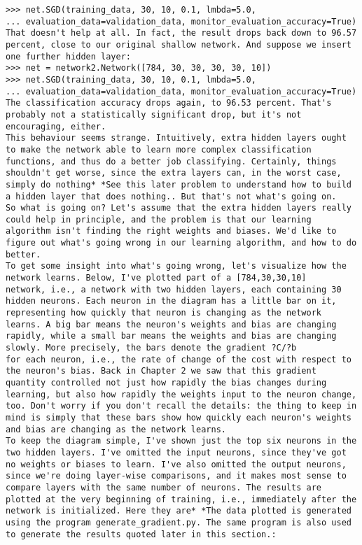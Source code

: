\begin{lstlisting}
>>> net.SGD(training_data, 30, 10, 0.1, lmbda=5.0, 
... evaluation_data=validation_data, monitor_evaluation_accuracy=True)
That doesn't help at all. In fact, the result drops back down to 96.57 percent, close to our original shallow network. And suppose we insert one further hidden layer:
>>> net = network2.Network([784, 30, 30, 30, 30, 10])
>>> net.SGD(training_data, 30, 10, 0.1, lmbda=5.0, 
... evaluation_data=validation_data, monitor_evaluation_accuracy=True)
The classification accuracy drops again, to 96.53 percent. That's probably not a statistically significant drop, but it's not encouraging, either.
This behaviour seems strange. Intuitively, extra hidden layers ought to make the network able to learn more complex classification functions, and thus do a better job classifying. Certainly, things shouldn't get worse, since the extra layers can, in the worst case, simply do nothing* *See this later problem to understand how to build a hidden layer that does nothing.. But that's not what's going on.
So what is going on? Let's assume that the extra hidden layers really could help in principle, and the problem is that our learning algorithm isn't finding the right weights and biases. We'd like to figure out what's going wrong in our learning algorithm, and how to do better.
To get some insight into what's going wrong, let's visualize how the network learns. Below, I've plotted part of a [784,30,30,10]
network, i.e., a network with two hidden layers, each containing 30 hidden neurons. Each neuron in the diagram has a little bar on it, representing how quickly that neuron is changing as the network learns. A big bar means the neuron's weights and bias are changing rapidly, while a small bar means the weights and bias are changing slowly. More precisely, the bars denote the gradient ?C/?b
for each neuron, i.e., the rate of change of the cost with respect to the neuron's bias. Back in Chapter 2 we saw that this gradient quantity controlled not just how rapidly the bias changes during learning, but also how rapidly the weights input to the neuron change, too. Don't worry if you don't recall the details: the thing to keep in mind is simply that these bars show how quickly each neuron's weights and bias are changing as the network learns.
To keep the diagram simple, I've shown just the top six neurons in the two hidden layers. I've omitted the input neurons, since they've got no weights or biases to learn. I've also omitted the output neurons, since we're doing layer-wise comparisons, and it makes most sense to compare layers with the same number of neurons. The results are plotted at the very beginning of training, i.e., immediately after the network is initialized. Here they are* *The data plotted is generated using the program generate_gradient.py. The same program is also used to generate the results quoted later in this section.:

\end{lstlisting}

